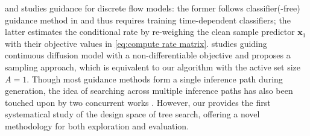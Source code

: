 \citet{nisonoff2024unlocking} 
and \citet{lin2025tfgflow} studies guidance for discrete flow models: the former follows classifier(-free) guidance method in \citet{ho2022classifier} and thus requires training time-dependent classifiers; the latter estimates the conditional rate by re-weighing the clean sample predictor $\boldsymbol{x}_1$ with their objective values in \eqref{eq:compute rate matrix}. \citep{huang2024symbolic} studies guiding continuous diffusion model with a non-differentiable objective and proposes a sampling approach, which is equivalent to our \xtsampling algorithm with the active set size $A = 1$. Though most guidance methods form a single inference path during generation, the idea of searching across multiple inference paths has also been touched upon by two concurrent works \citep{ma2025inference, uehara2025inference}. However, our \ouralg provides the first systematical study of the design space of tree search, offering a novel methodology for both exploration and evaluation.
